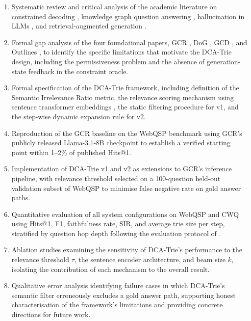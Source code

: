\begin{enumerate}[label=\roman*.]
	\item Systematic review and critical analysis of the academic literature on constrained decoding \citep{geng2023gcd,willard2023outlines,deutsch2019general}, knowledge graph question answering \citep{lan2022survey,he2021improving,jiang2022unikgqa}, hallucination in LLMs \citep{ji2023survey,huang2023survey}, and retrieval-augmented generation \citep{lewis2020retrieval,asai2024selfrag}.
	\item Formal gap analysis of the four foundational papers, GCR \citep{luo2024gcr}, DoG \citep{li2024dog}, GCD \citep{geng2023gcd}, and Outlines \citep{willard2023outlines}, to identify the specific limitations that motivate the DCA-Trie design, including the permissiveness problem and the absence of generation-state feedback in the constraint oracle.
	\item Formal specification of the DCA-Trie framework, including definition of the Semantic Irrelevance Ratio metric, the relevance scoring mechanism using sentence transformer embeddings \citep{reimers2019sentence}, the static filtering procedure for v1, and the step-wise dynamic expansion rule for v2.
	\item Reproduction of the GCR baseline on the WebQSP benchmark \citep{yih2016value} using GCR's publicly released Llama-3.1-8B checkpoint \citep{luo2024gcr} to establish a verified starting point within 1--2\% of published Hits@1.
	\item Implementation of DCA-Trie v1 and v2 as extensions to GCR's inference pipeline, with relevance threshold selected on a 100-question held-out validation subset of WebQSP to minimise false negative rate on gold answer paths.
	\item Quantitative evaluation of all system configurations on WebQSP and CWQ \citep{talmor2018web} using Hits@1, F1, faithfulness rate, SIR, and average trie size per step, stratified by question hop depth following the evaluation protocol of \citet{lan2022survey}.
	\item Ablation studies examining the sensitivity of DCA-Trie's performance to the relevance threshold $\tau$, the sentence encoder architecture, and beam size $k$, isolating the contribution of each mechanism to the overall result.
	\item Qualitative error analysis identifying failure cases in which DCA-Trie's semantic filter erroneously excludes a gold answer path, supporting honest characterisation of the framework's limitations and providing concrete directions for future work.
\end{enumerate}

